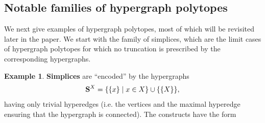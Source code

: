 \documentclass[11pt]{article}
\theoremstyle{definition}
\newtheorem{example}[theo]{Example}
\numberwithin{equation}{section}
\numberwithin{equation}{section}
\newcommand{\set}[1]{\{#1\}}
\newcommand{\setc}[2]{\set{#1 \mid #2}}
\newcommand{\union}{\cup}		%
\newcommand{\hyper}[1]{{\bf #1}}
\begin{document}
\subsection{Notable families of hypergraph polytopes} \label{notable-section}
We next give examples of hypergraph polytopes, most of which will be revisited later in the paper. We start with the family of simplices, which are the limit cases of hypergraph polytopes for which no truncation is prescribed by the corresponding hypergraphs. 
\begin{example}\label{simp}
{\bf Simplices} are ``encoded'' by the hypergraphs  $$\hyper{S}^X=\setc{\set{x}}{x\in X}\union\set{\set{X}},$$ having only trivial hyperedges (i.e. the vertices and the maximal hyperedge ensuring that the hypergraph is connected). The constructs have the form 
\begin{center}
\end{center}
\end{example}
\end{document}
